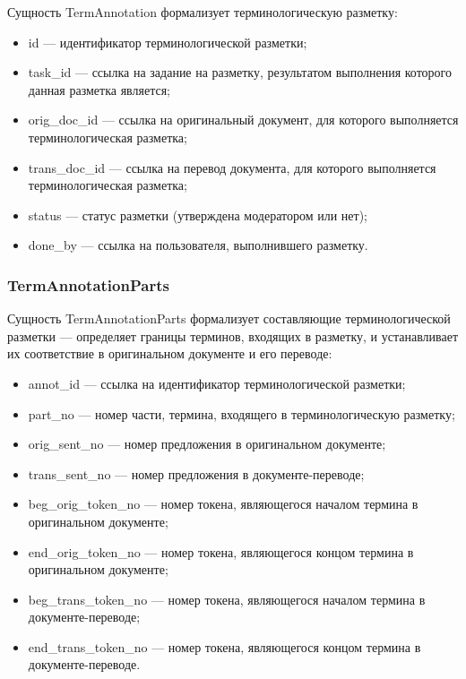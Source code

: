Сущность TermAnnotation формализует терминологическую разметку:
\begin{itemize}
    \item id --- идентификатор терминологической разметки;
    \item task\_id --- ссылка на задание на разметку, результатом выполнения которого данная разметка является;
    \item orig\_doc\_id --- ссылка на оригинальный документ, для которого выполняется терминологическая разметка;
    \item trans\_doc\_id --- ссылка на перевод документа, для которого выполняется терминологическая разметка;
    \item status --- статус разметки (утверждена модератором или нет);
    \item done\_by --- ссылка на пользователя, выполнившего разметку.
\end{itemize}

\subsubsection*{TermAnnotationParts}

Сущность TermAnnotationParts формализует составляющие терминологической разметки --- определяет границы терминов, входящих в разметку, и устанавливает их соответствие в оригинальном документе и его переводе:
\begin{itemize}
    \item annot\_id --- ссылка на идентификатор терминологической разметки;
    \item part\_no --- номер части, термина, входящего в терминологическую разметку;
    \item orig\_sent\_no --- номер предложения в оригинальном документе;
    \item trans\_sent\_no --- номер предложения в документе-переводе;
    \item beg\_orig\_token\_no --- номер токена, являющегося началом термина в оригинальном документе;
    \item end\_orig\_token\_no --- номер токена, являющегося концом термина в оригинальном документе;
    \item beg\_trans\_token\_no --- номер токена, являющегося началом термина в документе-переводе;
    \item end\_trans\_token\_no --- номер токена, являющегося концом термина в документе-переводе.
\end{itemize}

